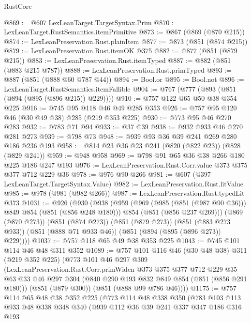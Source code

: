 \begin{lexlean}{RustCore}
\begin{coremodule}
@869 := @607 LexLeanTarget.TargetSyntax.Prim
@870 := LexLeanTarget.RustSemantics.itemPrimitive
@873 := @867 (@869 (@870 @215))
@874 := LexLeanPreservation.Rust.plainItem
@877 := @873 (@851 (@874 @215))
@879 := LexLeanPreservation.Rust.itemOK @375
@882 := @877 (@851 (@879 @215))
@883 := LexLeanPreservation.Rust.itemTyped
@887 := @882 (@851 (@883 @215 @787))
@888 := LexLeanPreservation.Rust.primTyped
@893 := @887 (@851 (@888 @60 @787 @44))
@894 := Bool.or
@895 := Bool.not
@896 := LexLeanTarget.RustSemantics.itemFallible
@904 := @767 (@777 (@893 (@851 (@894 (@895 (@896 @215)) @229))))
@910 := @757 @122 @65 @50 @38 @354 @225
@916 := @745 @95 @118 @46 @49 @285 @353
@926 := @757 @95 @120 @46 (@30 @49 @38) @285 (@219 @353 @225)
@930 := @773 @95 @46 @270 @283
@932 := @783 @71 @94
@933 := @37 @39
@938 := @932 @933 @46 @270 @281 @273
@939 := @798 @73
@948 := @939 @93 @36 @39 @241 @269 @280 @186 @236 @193
@958 := @814 @23 @36 @23 @241 (@820 (@822 @23)) (@828 (@829 @241))
@959 := @948 @958
@969 := @798 @91 @65 @36 @38 @266 @180 @225 @186 @247 @193
@976 := LexLeanPreservation.Rust.Corr.value @373 @375 @377 @712 @229 @36
@978 := @976 @90 @266
@981 := @607 (@397 LexLeanTarget.TargetSyntax.Value)
@982 := LexLeanPreservation.Rust.litValue
@985 := @978 (@981 (@982 @266))
@987 := LexLeanPreservation.Rust.typedLit @373
@1031 := @926
    (@930
      (@938
        (@959
          (@969 (@985 (@851 (@987 @90 @36))) @849 @854 (@851 (@856 @248 @180)))
          @854
          (@851 (@856 @237 @269)))
        (@869 (@870 @273))
        (@851 (@874 @273))
        (@851 (@879 @273))
        (@851 (@883 @273 @933))
        (@851 (@888 @71 @933 @46))
        (@851 (@894 (@895 (@896 @273)) @229))))
@1037 := @757 @118 @65 @49 @38 @353 @225
@1043 := @745 @101 @114 @46 @48 @311 @352
@1089 := @757
    @101
    @116
    @46
    (@30 @48 @38)
    @311
    (@219 @352 @225)
    (@773
      @101
      @46
      @297
      @309
      (LexLeanPreservation.Rust.Corr.primWiden
        @373
        @375
        @377
        @712
        @229
        @35
        @63
        @33
        @46
        @297
        @304
        (@840 @290 @193 @832 @849 @854 (@851 (@856 @291 @180)))
        (@851 (@879 @300))
        (@851 (@888 @99 @786 @46))))
@1175 := @757
    @114
    @65
    @48
    @38
    @352
    @225
    (@773
      @114
      @48
      @338
      @350
      (@783
        @103
        @113
        @933
        @48
        @338
        @348
        @340
        (@939
          @112
          @36
          @39
          @241
          @337
          @347
          @186
          @316
          @193

\end{coremodule}
\end{lexlean}
